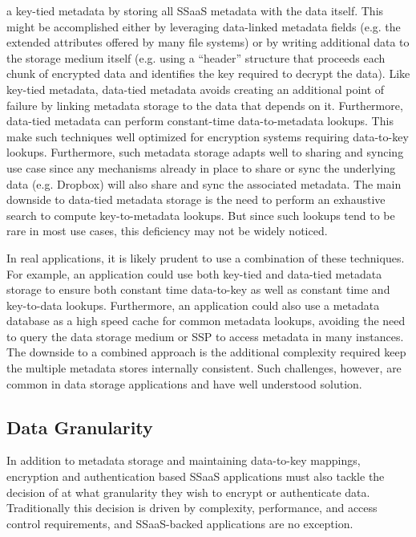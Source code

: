 \begin{packed_desc}
  a key-tied metadata by storing all SSaaS metadata with the data
  itself. This might be accomplished either by leveraging data-linked
  metadata fields (e.g. the extended attributes offered by many file
  systems) or by writing additional data to the storage medium itself
  (e.g. using a ``header'' structure that proceeds each chunk of
  encrypted data and identifies the key required to decrypt the
  data). Like key-tied metadata, data-tied metadata avoids creating an
  additional point of failure by linking metadata storage to the data
  that depends on it. Furthermore, data-tied metadata can perform
  constant-time data-to-metadata lookups. This make such techniques
  well optimized for encryption systems requiring data-to-key
  lookups. Furthermore, such metadata storage adapts well to sharing
  and syncing use case since any mechanisms already in place to share
  or sync the underlying data (e.g. Dropbox) will also share and sync
  the associated metadata. The main downside to data-tied metadata
  storage is the need to perform an exhaustive search to compute
  key-to-metadata lookups. But since such lookups tend to be rare in
  most use cases, this deficiency may not be widely noticed.
\end{packed_desc}

In real applications, it is likely prudent to use a combination of
these techniques. For example, an application could use both key-tied
and data-tied metadata storage to ensure both constant time
data-to-key as well as constant time and key-to-data
lookups. Furthermore, an application could also use a metadata
database as a high speed cache for common metadata lookups, avoiding
the need to query the data storage medium or SSP to access metadata in
many instances. The downside to a combined approach is the additional
complexity required keep the multiple metadata stores internally
consistent. Such challenges, however, are common in data storage
applications and have well understood solution.

\subsection{Data Granularity}

In addition to metadata storage and maintaining data-to-key mappings,
encryption and authentication based SSaaS applications must also
tackle the decision of at what granularity they wish to encrypt or
authenticate data. Traditionally this decision is driven by
complexity, performance, and access control requirements, and
SSaaS-backed applications are no exception.

